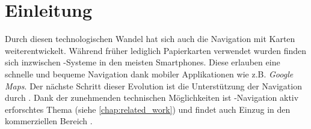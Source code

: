 \chapter{Einleitung}
Durch diesen technologischen Wandel hat sich auch die Navigation mit Karten weiterentwickelt.
Während früher lediglich Papierkarten verwendet wurden finden sich inzwischen -Systeme in den meisten Smartphones.
Diese erlauben eine schnelle und bequeme Navigation dank mobiler Applikationen wie z.B. \emph{Google Maps}.
Der nächste Schritt dieser Evolution ist die Unterstützung der Navigation durch .
Dank der zunehmenden technischen Möglichkeiten ist -Navigation aktiv erforschtes Thema (siehe \autoref{chap:related_work}) und findet auch Einzug in den kommerziellen Bereich \parencite{bibid}.


%
\cleardoublepage